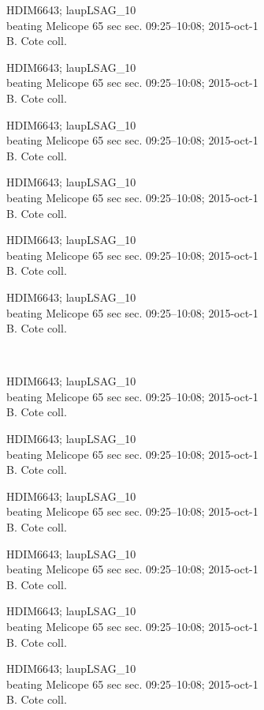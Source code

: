 \documentclass[2pt]{extarticle}
\begin{document}
\noindent
\parbox{0.16\textwidth}{\tiny \raggedright \rule[-0.3\baselineskip]{0pt}{10pt}HDIM6643; laupLSAG\_10\\ beating Melicope 65 sec sec. 09:25--10:08; 2015-oct-1\\ B. Cote coll.}
\parbox{0.16\textwidth}{\tiny \raggedright \rule[-0.3\baselineskip]{0pt}{10pt}HDIM6643; laupLSAG\_10\\ beating Melicope 65 sec sec. 09:25--10:08; 2015-oct-1\\ B. Cote coll.}
\parbox{0.16\textwidth}{\tiny \raggedright \rule[-0.3\baselineskip]{0pt}{10pt}HDIM6643; laupLSAG\_10\\ beating Melicope 65 sec sec. 09:25--10:08; 2015-oct-1\\ B. Cote coll.}
\parbox{0.16\textwidth}{\tiny \raggedright \rule[-0.3\baselineskip]{0pt}{10pt}HDIM6643; laupLSAG\_10\\ beating Melicope 65 sec sec. 09:25--10:08; 2015-oct-1\\ B. Cote coll.}
\parbox{0.16\textwidth}{\tiny \raggedright \rule[-0.3\baselineskip]{0pt}{10pt}HDIM6643; laupLSAG\_10\\ beating Melicope 65 sec sec. 09:25--10:08; 2015-oct-1\\ B. Cote coll.}
\parbox{0.16\textwidth}{\tiny \raggedright \rule[-0.3\baselineskip]{0pt}{10pt}HDIM6643; laupLSAG\_10\\ beating Melicope 65 sec sec. 09:25--10:08; 2015-oct-1\\ B. Cote coll.} \\ 
\vspace{0.001in} 

\noindent
\parbox{0.16\textwidth}{\tiny \raggedright \rule[-0.3\baselineskip]{0pt}{10pt}HDIM6643; laupLSAG\_10\\ beating Melicope 65 sec sec. 09:25--10:08; 2015-oct-1\\ B. Cote coll.}
\parbox{0.16\textwidth}{\tiny \raggedright \rule[-0.3\baselineskip]{0pt}{10pt}HDIM6643; laupLSAG\_10\\ beating Melicope 65 sec sec. 09:25--10:08; 2015-oct-1\\ B. Cote coll.}
\parbox{0.16\textwidth}{\tiny \raggedright \rule[-0.3\baselineskip]{0pt}{10pt}HDIM6643; laupLSAG\_10\\ beating Melicope 65 sec sec. 09:25--10:08; 2015-oct-1\\ B. Cote coll.}
\parbox{0.16\textwidth}{\tiny \raggedright \rule[-0.3\baselineskip]{0pt}{10pt}HDIM6643; laupLSAG\_10\\ beating Melicope 65 sec sec. 09:25--10:08; 2015-oct-1\\ B. Cote coll.}
\parbox{0.16\textwidth}{\tiny \raggedright \rule[-0.3\baselineskip]{0pt}{10pt}HDIM6643; laupLSAG\_10\\ beating Melicope 65 sec sec. 09:25--10:08; 2015-oct-1\\ B. Cote coll.}
\parbox{0.16\textwidth}{\tiny \raggedright \rule[-0.3\baselineskip]{0pt}{10pt}HDIM6643; laupLSAG\_10\\ beating Melicope 65 sec sec. 09:25--10:08; 2015-oct-1\\ B. Cote coll.} \\ 
\vspace{0.001in} 
\end{document}
